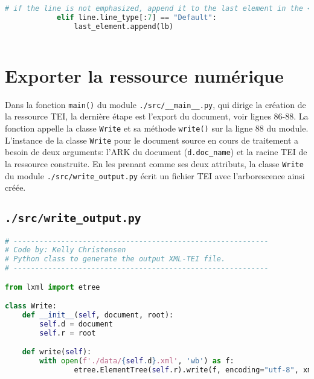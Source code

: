 \documentclass[class=article, crop=false]{standalone}
\begin{document}
\begin{lstlisting}[language=python, style=python]
            # if the line is not emphasized, append it to the last element in the <ab>
            elif line.line_type[:7] == "Default":
                last_element.append(lb)
                
\end{lstlisting}

\section{Exporter la ressource numérique}
Dans la fonction \texttt{main()} du module \texttt{./src/\_\_main\_\_.py}, qui dirige la création de la ressource \acrshort{TEI}, la dernière étape est l'export du document, voir lignes 86-88. La fonction appelle la classe \texttt{Write} et sa méthode \texttt{write()} sur la ligne 88 du module. L'instance de la classe \texttt{Write} pour le document source en cours de traitement a besoin de deux arguments: l'\acrshort{ARK} du document (\texttt{d.doc\_name}) et la racine \acrshort{TEI} de la ressource construite. En les prenant comme ses deux attributs, la classe \texttt{Write} du module \texttt{./src/write\_output.py} écrit un fichier \acrshort{TEI} avec l'arborescence ainsi créée.

\subsection{\texttt{./src/write\_output.py}}
\begin{lstlisting}[language=python, style=python]
# -----------------------------------------------------------
# Code by: Kelly Christensen
# Python class to generate the output XML-TEI file.
# -----------------------------------------------------------

from lxml import etree

class Write:
    def __init__(self, document, root):
        self.d = document
        self.r = root

    def write(self):
        with open(f'./data/{self.d}.xml', 'wb') as f:
                etree.ElementTree(self.r).write(f, encoding="utf-8", xml_declaration=True, pretty_print=True)
            

\end{lstlisting}
\end{document}
